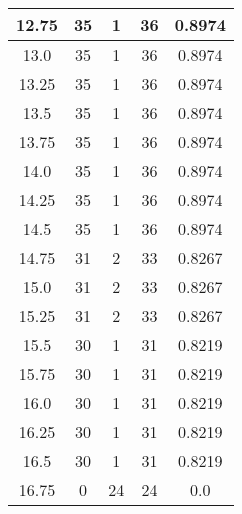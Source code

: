 \documentclass[letterpaper, 12pt]{article}
\begin{document}
\begin{longtable}{|c|c|c|c|c|}
\hline
12.75 & 35 & 1 & 36 & 0.8974 \\
\hline
13.0 & 35 & 1 & 36 & 0.8974 \\
\hline
13.25 & 35 & 1 & 36 & 0.8974 \\
\hline
13.5 & 35 & 1 & 36 & 0.8974 \\
\hline
13.75 & 35 & 1 & 36 & 0.8974 \\
\hline
14.0 & 35 & 1 & 36 & 0.8974 \\
\hline
14.25 & 35 & 1 & 36 & 0.8974 \\
\hline
14.5 & 35 & 1 & 36 & 0.8974 \\
\hline
14.75 & 31 & 2 & 33 & 0.8267 \\
\hline
15.0 & 31 & 2 & 33 & 0.8267 \\
\hline
15.25 & 31 & 2 & 33 & 0.8267 \\
\hline
15.5 & 30 & 1 & 31 & 0.8219 \\
\hline
15.75 & 30 & 1 & 31 & 0.8219 \\
\hline
16.0 & 30 & 1 & 31 & 0.8219 \\
\hline
16.25 & 30 & 1 & 31 & 0.8219 \\
\hline
16.5 & 30 & 1 & 31 & 0.8219 \\
\hline
16.75 & 0 & 24 & 24 & 0.0 \\
\hline
\end{longtable}
\end{document}
